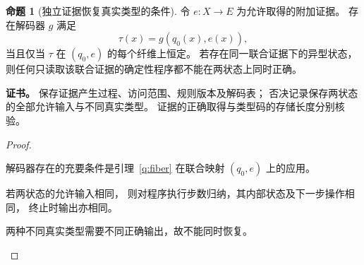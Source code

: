 \documentclass[UTF8,12pt,a4paper,openany,fontset=none,zihao=false]{ctexrep}
\theoremstyle{definition}
\newtheorem{proposition}{命题}[chapter]
\newenvironment{certificate}{\par\noindent\textbf{证书。}\ignorespaces}{\par}
\newcommand{\1}{\mathbf 1}
\begin{document}
\begin{proposition}[独立证据恢复真实类型的条件]
\label{q:evidence}
令 \(e:X\to E\) 为允许取得的附加证据。
存在解码器 \(g\) 满足
\[
\tau(x)=g(q_0(x),e(x)),
\]
当且仅当 \(\tau\) 在 \((q_0,e)\) 的每个纤维上恒定。
若存在同一联合证据下的异型状态，
则任何只读取该联合证据的确定性程序都不能在两状态上同时正确。
\end{proposition}
\begin{certificate}
保存证据产生过程、访问范围、规则版本及解码表；
否决记录保存两状态的全部允许输入与不同真实类型。
证据的正确取得与类型码的存储长度分别核验。
\end{certificate}
\begin{proof}
\begin{semanticsteps}
\item 解码器存在的充要条件是引理~\ref{q:fiber}
在联合映射 \((q_0,e)\) 上的应用。
\item 若两状态的允许输入相同，
则对程序执行步数归纳，其内部状态及下一步操作相同，
终止时输出亦相同。
\item 两种不同真实类型需要不同正确输出，故不能同时恢复。
\end{semanticsteps}
\end{proof}
\end{document}

